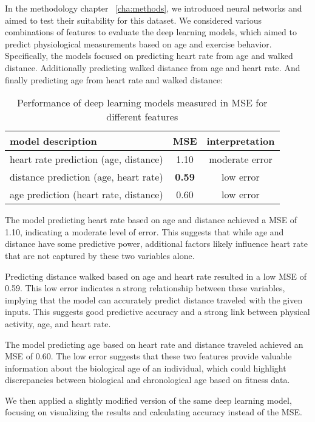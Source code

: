 In the methodology chapter ~\ref{cha:methods}, we introduced neural networks and aimed to test their suitability for this dataset. We considered various combinations of features to evaluate the deep learning models, which aimed to predict physiological measurements based on age and exercise behavior. Specifically, the models focused on predicting heart rate from age and walked distance. Additionally predicting walked distance from age and heart rate. And finally predicting age from heart rate and walked distance:

\FloatBarrier
\begin{table}[htbp]
\centering
\begin{tabular}{@{}lcc@{}}
\toprule
\textbf{model description} & \textbf{MSE} & \textbf{interpretation} \\ \midrule
heart rate prediction (age, distance) & 1.10 & moderate error \\
distance prediction (age, heart rate) & \textbf{0.59} & low error \\
age prediction (heart rate, distance) & 0.60 & low error \\ 
\bottomrule
\end{tabular}
\caption{Performance of deep learning models measured in MSE for different features}
\end{table}
\FloatBarrier

The model predicting heart rate based on age and distance achieved a MSE of 1.10, indicating a moderate level of error. This suggests that while age and distance have some predictive power, additional factors likely influence heart rate that are not captured by these two variables alone.

Predicting distance walked based on age and heart rate resulted in a low MSE of 0.59. This low error indicates a strong relationship between these variables, implying that the model can accurately predict distance traveled with the given inputs. This suggests good predictive accuracy and a strong link between physical activity, age, and heart rate.

The model predicting age based on heart rate and distance traveled achieved an MSE of 0.60. The low error suggests that these two features provide valuable information about the biological age of an individual, which could highlight discrepancies between biological and chronological age based on fitness data.

We then applied a slightly modified version of the same deep learning model, focusing on visualizing the results and calculating accuracy instead of the MSE. 

